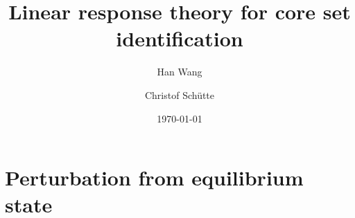 \documentclass[aip,jcp,a4paper,reprint,onecolumn]{revtex4-1}
\begin{document}
\title{Linear response theory for core set identification}
\author{Han Wang}
\author{Christof Sch\"utte}

\date{\today}

\begin{abstract}
\end{abstract}

\maketitle

\section{Perturbation from equilibrium state}
\end{document}
